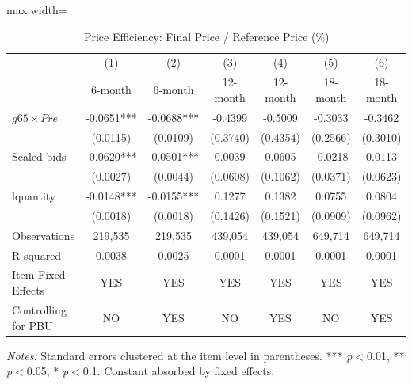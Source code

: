 \begin{table}[htbp]
\centering
\caption{Price Efficiency: Final Price / Reference Price (\%)}
\label{tab:efficiency}
\begin{adjustbox}{max width=\textwidth}
\begin{threeparttable}
\small
\begin{tabular}{lcccccc}
\toprule
 & (1) & (2) & (3) & (4) & (5) & (6) \\
 & 6-month & 6-month & 12-month & 12-month & 18-month & 18-month \\
\midrule
$g65 \times Pre$ & -0.0651*** & -0.0688*** & -0.4399 & -0.5009 & -0.3033 & -0.3462 \\
 & (0.0115) & (0.0109) & (0.3740) & (0.4354) & (0.2566) & (0.3010) \\
Sealed bids & -0.0620*** & -0.0501*** & 0.0039 & 0.0605 & -0.0218 & 0.0113 \\
 & (0.0027) & (0.0044) & (0.0608) & (0.1062) & (0.0371) & (0.0623) \\
lquantity & -0.0148*** & -0.0155*** & 0.1277 & 0.1382 & 0.0755 & 0.0804 \\
 & (0.0018) & (0.0018) & (0.1426) & (0.1521) & (0.0909) & (0.0962) \\
\midrule
Observations & 219,535 & 219,535 & 439,054 & 439,054 & 649,714 & 649,714 \\
R-squared & 0.0038 & 0.0025 & 0.0001 & 0.0001 & 0.0001 & 0.0001 \\
Item Fixed Effects & YES & YES & YES & YES & YES & YES \\
Controlling for PBU & NO & YES & NO & YES & NO & YES \\
\bottomrule
\end{tabular}
\begin{tablenotes}
\small
\item \textit{Notes:} Standard errors clustered at the item level in parentheses.
*** \textit{p}$<$0.01, ** \textit{p}$<$0.05, * \textit{p}$<$0.1.
Constant absorbed by fixed effects.
\end{tablenotes}
\end{threeparttable}
\end{adjustbox}
\end{table}
